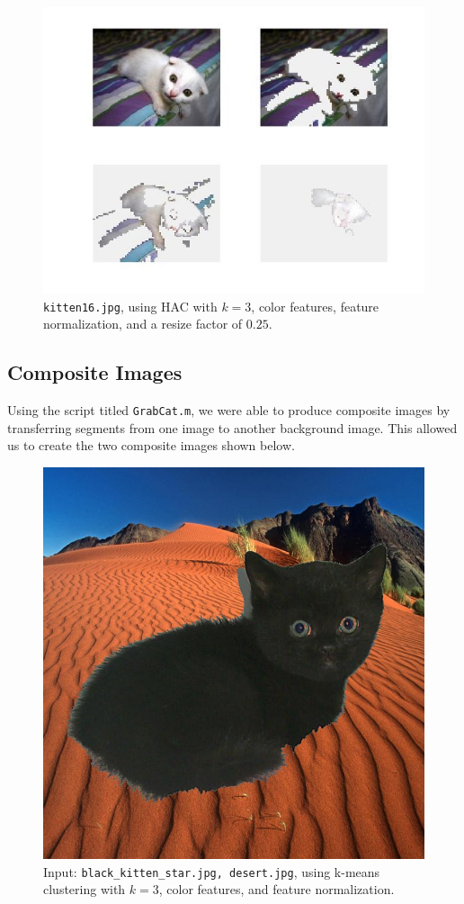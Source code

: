 \documentclass[12pt]{article}
\begin{document}
\begin{figure}[H]
	\centering
	\includegraphics[width=.95\textwidth]{unsucc3.jpg}
	\caption{\texttt{kitten16.jpg}, using HAC with $k = 3$, color features, feature normalization, and a resize factor of $0.25$.}
\end{figure}

\subsection{Composite Images}
Using the script titled \texttt{GrabCat.m}, we were able to produce composite images by transferring segments from one image to another background image. This allowed us to create the two composite images shown below.

\begin{figure}[H]
	\centering
	\includegraphics[width=.5\textwidth]{grabcat1.jpg}
	\caption{Input: \texttt{black\_kitten\_star.jpg, desert.jpg}, using k-means clustering with $k = 3$, color features, and feature normalization.}
\end{figure}
\end{document}
